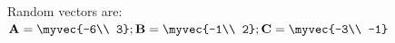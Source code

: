 \documentclass[article,12pt]{IEEEtran}
\begin{document}
\let\vec\mathbf
Random vectors are: \\
$\vec{A} =\myvec{-6\\ 3}; 
\vec{B} =\myvec{-1\\ 2}; 
\vec{C} =\myvec{-3\\ -1}$ \\
\else
    \def\gnumericTableEnd{}
\fi
\providecommand{\gnumericmathit}[1]{#1} 
\providecommand{\gnumericPB}[1]%
{\let\gnumericTemp=\\#1\let\\=\gnumericTemp\hspace{0pt}}
        \newlength{\gnumericTableWidth}
        \newlength{\gnumericTableWidthComplete}
        \newlength{\gnumericMultiRowLength}
        \global\def\gnumericTableWidthDefined{}
 \fi
\providecommand\gnumbox{\makebox[0pt]}
\end{document}
